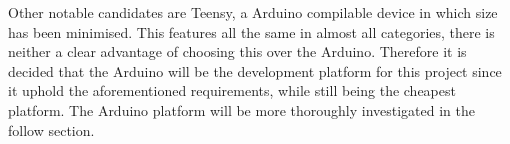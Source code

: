 Other notable candidates are Teensy, a Arduino compilable device in which size has been minimised.
This features all the same in almost all categories, there is neither a clear advantage of choosing this over the Arduino. 
Therefore it is decided that the Arduino will be the development platform for this project since it uphold the aforementioned requirements, while still being the cheapest platform.
The Arduino platform will be more thoroughly investigated in the follow section.

